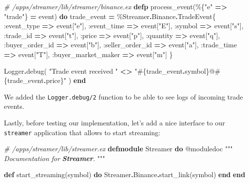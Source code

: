 \documentclass[
  oneside]{book}
\newenvironment{Shaded}{\begin{snugshade}}{\end{snugshade}}
\newcommand{\CommentTok}[1]{\textcolor[rgb]{0.56,0.35,0.01}{\textit{#1}}}
\newcommand{\ConstantTok}[1]{\textcolor[rgb]{0.00,0.00,0.00}{#1}}
\newcommand{\InformationTok}[1]{\textcolor[rgb]{0.56,0.35,0.01}{\textbf{\textit{#1}}}}
\newcommand{\KeywordTok}[1]{\textcolor[rgb]{0.13,0.29,0.53}{\textbf{#1}}}
\newcommand{\NormalTok}[1]{#1}
\newcommand{\OperatorTok}[1]{\textcolor[rgb]{0.81,0.36,0.00}{\textbf{#1}}}
\newcommand{\OtherTok}[1]{\textcolor[rgb]{0.56,0.35,0.01}{#1}}
\newcommand{\StringTok}[1]{\textcolor[rgb]{0.31,0.60,0.02}{#1}}
\newcommand{\VariableTok}[1]{\textcolor[rgb]{0.00,0.00,0.00}{#1}}
\begin{document}
\begin{Shaded}
\begin{Highlighting}[]
  \CommentTok{\# /apps/streamer/lib/streamer/binance.ex}
  \KeywordTok{defp}\NormalTok{ process\_event(\%\{}\StringTok{"e"} \OperatorTok{=\textgreater{}} \StringTok{"trade"}\NormalTok{\} }\OperatorTok{=}\NormalTok{ event) }\KeywordTok{do}
\NormalTok{    trade\_event }\OperatorTok{=}\NormalTok{ \%}\ConstantTok{Streamer}\OperatorTok{.}\ConstantTok{Binance}\OperatorTok{.}\ConstantTok{TradeEvent}\NormalTok{\{}
      \VariableTok{:event\_type} \OperatorTok{=\textgreater{}}\NormalTok{ event[}\StringTok{"e"}\NormalTok{],}
      \VariableTok{:event\_time} \OperatorTok{=\textgreater{}}\NormalTok{ event[}\StringTok{"E"}\NormalTok{],}
      \VariableTok{:symbol} \OperatorTok{=\textgreater{}}\NormalTok{ event[}\StringTok{"s"}\NormalTok{],}
      \VariableTok{:trade\_id} \OperatorTok{=\textgreater{}}\NormalTok{ event[}\StringTok{"t"}\NormalTok{],}
      \VariableTok{:price} \OperatorTok{=\textgreater{}}\NormalTok{ event[}\StringTok{"p"}\NormalTok{],}
      \VariableTok{:quantity} \OperatorTok{=\textgreater{}}\NormalTok{ event[}\StringTok{"q"}\NormalTok{],}
      \VariableTok{:buyer\_order\_id} \OperatorTok{=\textgreater{}}\NormalTok{ event[}\StringTok{"b"}\NormalTok{],}
      \VariableTok{:seller\_order\_id} \OperatorTok{=\textgreater{}}\NormalTok{ event[}\StringTok{"a"}\NormalTok{],}
      \VariableTok{:trade\_time} \OperatorTok{=\textgreater{}}\NormalTok{ event[}\StringTok{"T"}\NormalTok{],}
      \VariableTok{:buyer\_market\_maker} \OperatorTok{=\textgreater{}}\NormalTok{ event[}\StringTok{"m"}\NormalTok{]}
\NormalTok{    \}}

    \ConstantTok{Logger}\OperatorTok{.}\NormalTok{debug(}
      \StringTok{"Trade event received "} \OperatorTok{\textless{}\textgreater{}}
        \StringTok{"}\OtherTok{\#\{}\NormalTok{trade\_event}\OperatorTok{.}\NormalTok{symbol}\OtherTok{\}}\StringTok{@}\OtherTok{\#\{}\NormalTok{trade\_event}\OperatorTok{.}\NormalTok{price}\OtherTok{\}}\StringTok{"}
\NormalTok{    )}
  \KeywordTok{end}
\end{Highlighting}
\end{Shaded}

We added the \texttt{Logger.debug/2} function to be able to see logs of incoming trade events.

Lastly, before testing our implementation, let's add a nice interface to our \texttt{streamer} application that allows to start streaming:

\begin{Shaded}
\begin{Highlighting}[]
\CommentTok{\# /apps/streamer/lib/streamer.ex}
\KeywordTok{defmodule} \ConstantTok{Streamer} \KeywordTok{do}
  \OtherTok{@moduledoc """}
\CommentTok{  Documentation for }\InformationTok{\textasciigrave{}Streamer\textasciigrave{}}\CommentTok{.}
\CommentTok{  }\OtherTok{"""}

  \KeywordTok{def}\NormalTok{ start\_streaming(symbol) }\KeywordTok{do}
    \ConstantTok{Streamer}\OperatorTok{.}\ConstantTok{Binance}\OperatorTok{.}\NormalTok{start\_link(symbol)}
  \KeywordTok{end}
\KeywordTok{end}
\end{Highlighting}
\end{Shaded}
\end{document}
